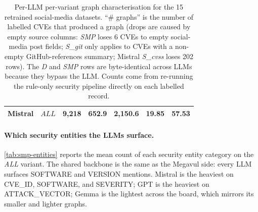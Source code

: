 \documentclass[11pt,a4paper]{article}
\begin{document}
\begin{table}[!htbp]
\begin{tabular}{l l r r r r r}
Mistral & $ALL$     & 9{,}218 &  652.9 & 2{,}150.6 & 19.85 &  57.53 \\
\bottomrule
\end{tabular}
\caption{Per-LLM per-variant graph characterisation for the
15 retrained social-media datasets. ``\# graphs'' is the
number of labelled CVEs that produced a graph (drops are
caused by empty source columns: \emph{SMP} loses 6 CVEs
to empty social-media post fields; \emph{S\_git} only
applies to CVEs with a non-empty GitHub-references
summary; Mistral \emph{S\_cvss} loses 202 rows). The
\emph{D} and \emph{SMP} rows are byte-identical across LLMs
because they bypass the LLM. Counts come from re-running
the rule-only security pipeline directly on each labelled
record.}
\label{tab:smp-graph-grid}
\end{table}

\paragraph{Which security entities the LLMs surface.}
\autoref{tab:smp-entities} reports the mean count of each
security entity category on the \emph{ALL} variant. The
shared backbone is the same as the Megavul side: every LLM
surfaces SOFTWARE and VERSION mentions. Mistral is the
heaviest on CVE\_ID, SOFTWARE, and SEVERITY; GPT is the
heaviest on ATTACK\_VECTOR; Gemma is the lightest across
the board, which mirrors its smaller and lighter graphs.

\begin{table}[!htbp]
\centering\footnotesize
\setlength{\tabcolsep}{4pt}
\caption{Mean count of each security entity category per
graph on the social-media \emph{ALL} variant. The
CWE\_ID counts are tiny because the LLM summaries
rarely quote the literal CWE identifier string.
ATTACK\_VECTOR, IMPACT,
SEVERITY, and CODE\_ELEMENT are the categories that vary
most between LLMs and that the exploitation-prediction
task cares about.}
\label{tab:smp-entities}
\end{table}
\end{document}
